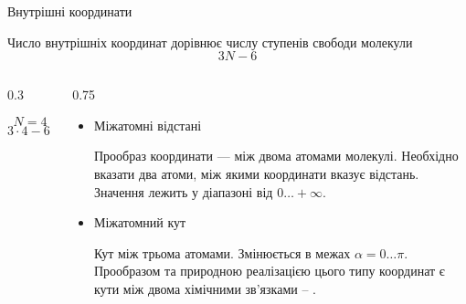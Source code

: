 \documentclass[]{beamer}
\begin{document}
\begin{frame}[fragile, t]{Внутрішні координати}{}
	\begin{alertblock}{}
		Число внутрішніх координат дорівнює числу ступенів свободи молекули
		\begin{equation*}
			3N - 6
		\end{equation*}
	\end{alertblock}
	\begin{overprint}
		\begin{columns}
			\begin{column}{0.3\linewidth}
				\begin{center}
					\begin{center}
					\end{center}
				\end{center}
				\[
					N = 4
				\]
				\[
					3 \cdot 4 - 6 = 3 + 2 + 1
				\]
			\end{column}
			\begin{column}{0.75\linewidth}
				\begin{itemize}
					\item Міжатомні відстані
					      \begin{block}{}\scriptsize\justifying
						      Прообраз координати ---  між двома атомами молекулі. Необхідно вказати два атоми, між якими координати вказує відстань. Значення лежить у діапазоні від $0 \ldots +\infty$.
					      \end{block}
					\item Міжатомний кут
					      \begin{block}{}\scriptsize\justifying
						      Кут між трьома атомами. Змінюється в межах $\alpha = 0 \ldots \pi $.  Прообразом та природною реалізацією цього типу координат є кути між двома хімічними зв'язками -- .

\end{block}
\end{itemize}
\end{column}
\end{columns}
\end{overprint}
\end{frame}
\end{document}
